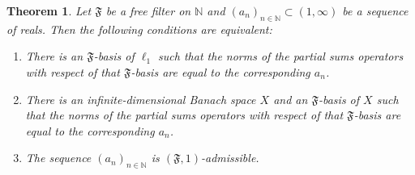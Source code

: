 \documentclass[11pt,twoside, reqno]{amsart}
\newcommand{\N}{{\mathbb N}}
\newcommand{\F}{\mathfrak{F}}
\theoremstyle{plain}
\newtheorem{theorem}{Theorem}[section]
\theoremstyle{remark}
\theoremstyle{definition}
\numberwithin{equation}{section}
\begin{document}
\begin{theorem}  \label{thm-F-bas-1}
Let $\F$ be a free filter on $\N$ and $ (a_n)_{n \in \N} \subset (1, \infty)$ be a sequence of reals. Then the following conditions are equivalent:
\begin{enumerate}
\item[(i)] There is an $\F$-basis  of $\ell_1$ such that the norms of the partial sums operators with respect of that $\F$-basis are equal to the corresponding $a_n$.

\item[(ii)] There is an infinite-dimensional Banach space $X$ and an $\F$-basis of $X$ such that the norms of the partial sums operators with respect of that $\F$-basis are equal to the corresponding $a_n$.

\item[(iii)] The sequence $ (a_n)_{n \in \N}$ is $(\F, 1)$-admissible.
\end{enumerate}
\end{theorem}
\end{document}
